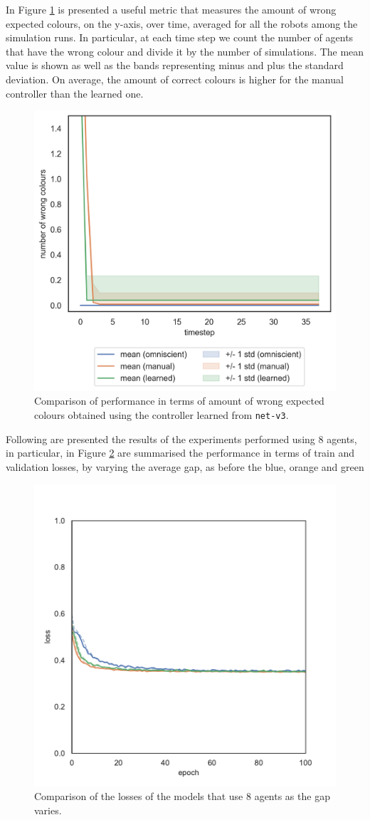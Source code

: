 In Figure \ref{fig:net-v3error} is presented a useful metric that measures the 
amount of wrong expected colours, on the y-axis, over time, averaged for all the 
robots among the simulation runs. In particular, at each time step we count the 
number of agents that have the wrong colour and divide it by the number of 
simulations.
The mean value is shown as well as the bands representing minus and plus the 
standard deviation.
On average, the amount of correct colours is higher for the manual controller 
than the learned one. 
\begin{figure}[!htb]
	\centering
	\includegraphics[width=.5\textwidth]{contents/images/net-v3/colours-errors-compressed}%
	\caption[Evaluation of \texttt{net-v3} amount of wrong expected 
	colours.]{Comparison of performance in terms of amount of wrong expected 
	colours obtained using the controller learned from \texttt{net-v3}.}
	\label{fig:net-v3error}
\end{figure}

Following are presented the results of the experiments performed using $8$ 
agents, in particular, in Figure \ref{fig:commlossn8t2} are summarised the 
performance in terms of train and validation losses, by varying the average gap, as 
before the blue, orange and green 
\begin{figure}[!htb]
	\centering
	\includegraphics[width=.45\textwidth]{contents/images/task2/loss-communication-N8}
	\caption{Comparison of the losses of the models that use $8$ agents as the gap 
		varies.}
	\label{fig:commlossn8t2}
\end{figure}


